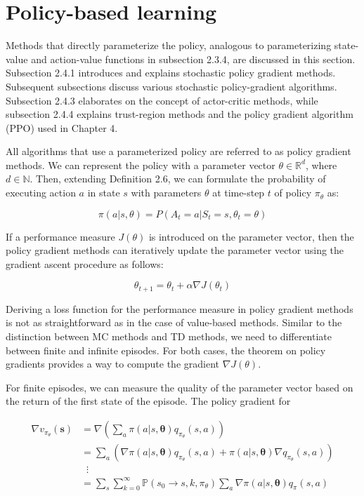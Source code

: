 \documentclass[../xlapes02]{subfiles}
\begin{document}
    \section{Policy-based learning}\label{sec:policy-based}
    Methods that directly parameterize the policy, analogous to parameterizing state-value and action-value functions in subsection 2.3.4, are discussed in this section. Subsection 2.4.1 introduces and explains stochastic policy gradient methods. Subsequent subsections discuss various stochastic policy-gradient algorithms. Subsection 2.4.3 elaborates on the concept of actor-critic methods, while subsection 2.4.4 explains trust-region methods and the policy gradient algorithm (PPO) used in Chapter 4.

    All algorithms that use a parameterized policy are referred to as policy gradient methods. We can represent the policy with a parameter vector \( \theta \in \mathbb{R}^d \), where \( d \in \mathbb{N} \). Then, extending Definition 2.6, we can formulate the probability of executing action \( a \) in state \( s \) with parameters \( \theta \) at time-step \( t \) of policy \( \pi_\theta \) as:

    \[ \pi(a|s,\theta) = P(A_t = a|S_t = s,\theta_t = \theta) \]

    If a performance measure \( J(\theta) \) is introduced on the parameter vector, then the policy gradient methods can iteratively update the parameter vector using the gradient ascent procedure as follows:

    \[ \theta_{t+1} = \theta_t + \alpha \nabla J(\theta_t) \]

    Deriving a loss function for the performance measure in policy gradient methods is not as straightforward as in the case of value-based methods. Similar to the distinction between MC methods and TD methods, we need to differentiate between finite and infinite episodes. For both cases, the theorem on policy gradients provides a way to compute the gradient \( \nabla J(\theta) \).

    For finite episodes, we can measure the quality of the parameter vector based on the return of the first state of the episode. The policy gradient for

    \begin{equation}
        \begin{split}
            \nabla v_{\pi_\theta}(\mathbf{s}) &= \nabla \left( \sum_{a} \pi(a | s, \mathbf{\theta}) q_{\pi_\theta}(s,a) \right) \\
            &= \sum_{a} (\nabla \pi(a | s, \mathbf{\theta}) q_{\pi_\theta}(s,a) + \pi(a | s, \mathbf{\theta}) \nabla q_{\pi_\theta}(s,a)) \\
            &\mspace{10mu}\vdots\\
            &= \sum_{s}\sum_{k=0}^{\infty} \mathbb{P}(s_0 \rightarrow s, k, \pi_\theta) \sum_{a} \nabla \pi(a | s, \mathbf{\theta}) q_\pi(s,a)
        \end{split}
    \end{equation}
\end{document}
